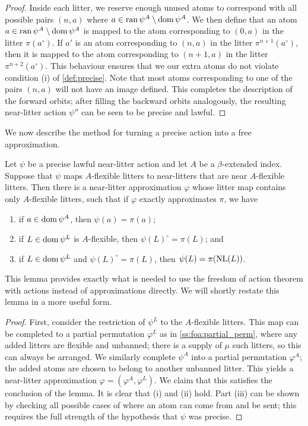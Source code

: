\begin{proof}
    Inside each litter, we reserve enough unused atoms to correspond with all possible pairs \( (n, a) \) where \( a \in \operatorname{ran} \psi^A \setminus \operatorname{dom} \psi^A \).
    We then define that an atom \( a \in \operatorname{ran} \psi^A \setminus \operatorname{dom} \psi^A \) is mapped to the atom corresponding to \( (0, a) \) in the litter \( \pi(a^\circ) \).
    If \( a' \) is an atom corresponding to \( (n, a) \) in the litter \( \pi^{n+1}(a^\circ) \), then it is mapped to the atom corresponding to \( (n+1, a) \) in the litter \( \pi^{n+2}(a^\circ) \).
    This behaviour ensures that we our extra atoms do not violate condition (i) of \cref{def:precise}.
    Note that most atoms corresponding to one of the pairs \( (n, a) \) will not have an image defined.
    This completes the description of the forward orbits; after filling the backward orbits analogously, the resulting near-litter action \( \psi'' \) can be seen to be precise and lawful.
\end{proof}

We now describe the method for turning a precise action into a free approximation.

\begin{lemma}
    \label{lem:foa:nl_action_to_approx}
    Let \( \psi \) be a precise lawful near-litter action and let \( A \) be a \( \beta \)-extended index.
    Suppose that \( \psi \) maps \( A \)-flexible litters to near-litters that are near \( A \)-flexible litters.
    Then there is a near-litter approximation \( \varphi \) whose litter map contains only \( A \)-flexible litters, such that if \( \varphi \) exactly approximates \( \pi \), we have
    \begin{enumerate}
        \item if \( a \in \operatorname{dom} \psi^A \), then \( \psi(a) = \pi(a) \);
        \item if \( L \in \operatorname{dom} \psi^L \) is \( A \)-flexible, then \( \psi(L)^\circ = \pi(L) \); and
        \item if \( L \in \operatorname{dom} \psi^L \) and \( \psi(L)^\circ = \pi(L) \), then \( \psi(L) = \pi(\operatorname{NL}(L)) \).
    \end{enumerate}
\end{lemma}
This lemma provides exactly what is needed to use the freedom of action theorem with actions instead of approximations directly.
We will shortly restate this lemma in a more useful form.
\begin{proof}
    First, consider the restriction of \( \psi^L \) to the \( A \)-flexible litters.
    This map can be completed to a partial permutation \( \varphi^L \) as in \cref{ss:foa:partial_perm}, where any added litters are flexible and unbanned; there is a supply of \( \mu \) such litters, so this can always be arranged.
    We similarly complete \( \psi^A \) into a partial permutation \( \varphi^A \); the added atoms are chosen to belong to another unbanned litter.
    This yields a near-litter approximation \( \varphi = (\varphi^A, \varphi^L) \).
    We claim that this satisfies the conclusion of the lemma.
    It is clear that (i) and (ii) hold.
    Part (iii) can be shown by checking all possible cases of where an atom can come from and be sent; this requires the full strength of the hypothesis that \( \psi \) was precise.
\end{proof}

